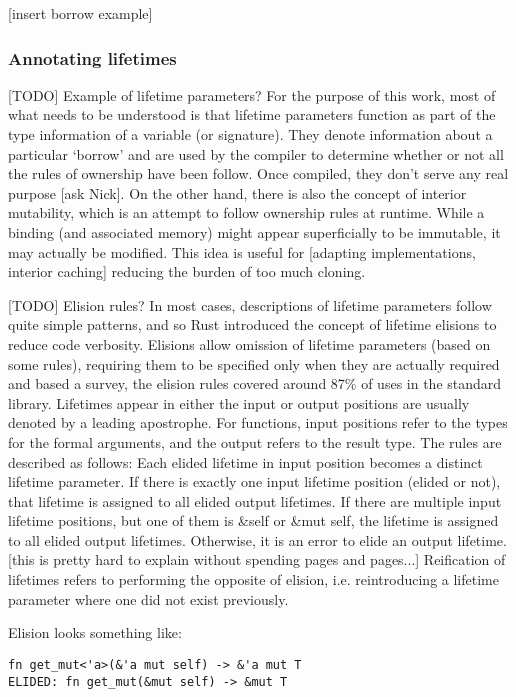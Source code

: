 [insert borrow example]

\subsubsection{Annotating lifetimes}
[TODO] Example of lifetime parameters? For the purpose of this work, most of what needs to be understood is that lifetime parameters function as part of the type information of a variable (or signature). They denote information about a particular `borrow' and are used by the compiler to determine whether or not all the rules of ownership have been follow. Once compiled, they don't serve any real purpose [ask Nick]. On the other hand, there is also the concept of interior mutability, which is an attempt to follow ownership rules at runtime. While a binding (and associated memory) might appear superficially to be immutable, it may actually be modified. This idea is useful for [adapting implementations, interior caching] reducing the burden of too much cloning.

[TODO] Elision rules? In most cases, descriptions of lifetime parameters follow quite simple patterns, and so Rust introduced the concept of lifetime elisions to reduce code verbosity. Elisions allow omission of lifetime parameters (based on some rules), requiring them to be specified only when they are actually required and based a survey, the elision rules covered around 87\% of uses in the standard library. Lifetimes appear in either the input or output positions are usually denoted by a leading apostrophe. For functions, input positions refer to the types for the formal arguments, and the output refers to the result type. The rules are described as follows: Each elided lifetime in input position becomes a distinct lifetime parameter. If there is exactly one input lifetime position (elided or not), that lifetime is assigned to all elided output lifetimes. If there are multiple input lifetime positions, but one of them is \&self or \&mut self, the lifetime is assigned to all elided output lifetimes. Otherwise, it is an error to elide an output lifetime. [this is pretty hard to explain without spending pages and pages...] Reification of lifetimes refers to performing the opposite of elision, i.e. reintroducing a lifetime parameter where one did not exist previously.

Elision looks something like:
\begin{verbatim}
fn get_mut<'a>(&'a mut self) -> &'a mut T
ELIDED: fn get_mut(&mut self) -> &mut T
\end{verbatim}

